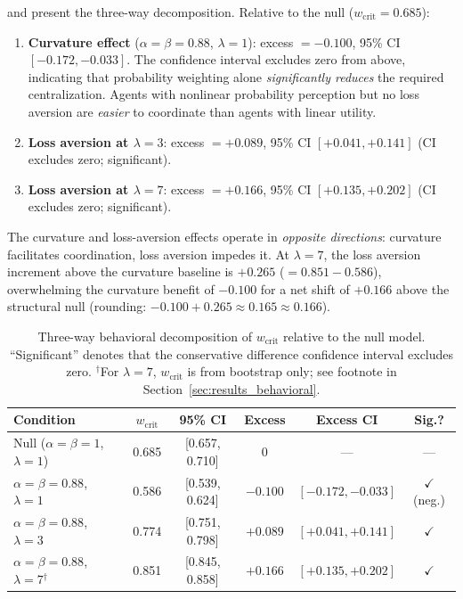 \documentclass[letterpaper]{article}
\theoremstyle{plain}
\newcommand{\wcrit}{w_{\mathrm{crit}}}
\begin{document}
 and  present the
three-way decomposition.
Relative to the null ($\wcrit = 0.685$):

\begin{enumerate}
  \item \textbf{Curvature effect} ($\alpha{=}\beta{=}0.88$, $\lambda{=}1$):
        excess $= -0.100$, 95\% CI $[-0.172, -0.033]$.
        The confidence interval excludes zero from above, indicating that
        probability weighting alone \emph{significantly reduces} the
        required centralization.
        Agents with nonlinear probability perception but no loss aversion
        are \emph{easier} to coordinate than agents with linear utility.

  \item \textbf{Loss aversion at $\lambda{=}3$}:
        excess $= +0.089$, 95\% CI $[+0.041, +0.141]$
        (CI excludes zero; significant).

  \item \textbf{Loss aversion at $\lambda{=}7$}:
        excess $= +0.166$, 95\% CI $[+0.135, +0.202]$
        (CI excludes zero; significant).
\end{enumerate}

The curvature and loss-aversion effects operate in \emph{opposite
directions}: curvature facilitates coordination, loss aversion impedes it.
At $\lambda{=}7$, the loss aversion increment above the curvature baseline
is $+0.265$ ($= 0.851 - 0.586$), overwhelming the curvature benefit
of $-0.100$ for a net shift of $+0.166$ above the structural null
(rounding: $-0.100 + 0.265 \approx 0.165 \approx 0.166$).

\begin{table}[t]
\centering
\caption{Three-way behavioral decomposition of $\wcrit$ relative to the
null model. ``Significant'' denotes that the conservative difference
confidence interval excludes zero. $^{\dagger}$For $\lambda{=}7$,
$\wcrit$ is from bootstrap only; see footnote in
Section~\ref{sec:results_behavioral}.}
\label{tab:decomposition}
\small
\begin{tabular}{lccccc}
\toprule
Condition & $\wcrit$ & 95\% CI & Excess & Excess CI & Sig.? \\
\midrule
Null ($\alpha{=}\beta{=}1$, $\lambda{=}1$) & 0.685 & [0.657, 0.710] & 0 & --- & --- \\
$\alpha{=}\beta{=}0.88$, $\lambda{=}1$ & 0.586 & [0.539, 0.624] & $-0.100$ & $[-0.172, -0.033]$ & $\checkmark$ (neg.) \\
$\alpha{=}\beta{=}0.88$, $\lambda{=}3$ & 0.774 & [0.751, 0.798] & $+0.089$ & $[+0.041, +0.141]$ & $\checkmark$ \\
$\alpha{=}\beta{=}0.88$, $\lambda{=}7$$^{\dagger}$ & 0.851 & [0.845, 0.858] & $+0.166$ & $[+0.135, +0.202]$ & $\checkmark$ \\
\bottomrule
\end{tabular}
\end{table}
\end{document}
